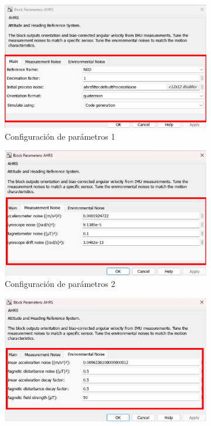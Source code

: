 \begin{figure}[htbp]
\begin{subfigure}[b]{0.45\textwidth}
        \includegraphics[width=\textwidth]{fig/Capitulo5/Caso_de_estudio_IMU/Generador_de_salidas/configuracion_AHRS_01.pdf}
        \caption{Configuración de parámetros 1}
        \label{fig:parametros_AHRS_01}
    \end{subfigure}
    \hfill
    \begin{subfigure}[b]{0.45\textwidth}
        \centering
        \includegraphics[width=\textwidth]{fig/Capitulo5/Caso_de_estudio_IMU/Generador_de_salidas/configuracion_AHRS_02.pdf}
        \caption{Configuración de parámetros 2}
        \label{fig:parametros_AHRS_02}
    \end{subfigure}
    \hfill
    \begin{subfigure}[b]{0.45\textwidth}
        \centering
        \includegraphics[width=\textwidth]{fig/Capitulo5/Caso_de_estudio_IMU/Generador_de_salidas/configuracion_AHRS_03.pdf}

\end{subfigure}
\end{figure}
